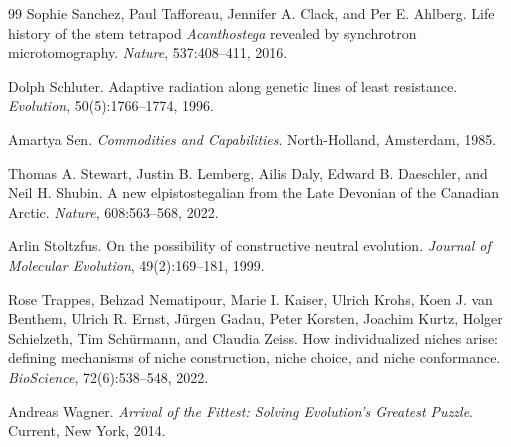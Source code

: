\documentclass[11pt,a4paper]{article}
\theoremstyle{remark}
\begin{document}
\begin{thebibliography}{99}
Sophie Sanchez, Paul Tafforeau, Jennifer A. Clack, and Per E. Ahlberg.
\newblock Life history of the stem tetrapod \emph{Acanthostega} revealed by synchrotron microtomography.
\newblock \emph{Nature}, 537:408--411, 2016.

Dolph Schluter.
\newblock Adaptive radiation along genetic lines of least resistance.
\newblock \emph{Evolution}, 50(5):1766--1774, 1996.

Amartya Sen.
\newblock \emph{Commodities and Capabilities}.
\newblock North-Holland, Amsterdam, 1985.

Thomas A. Stewart, Justin B. Lemberg, Ailis Daly, Edward B. Daeschler, and Neil H. Shubin.
\newblock A new elpistostegalian from the Late Devonian of the Canadian Arctic.
\newblock \emph{Nature}, 608:563--568, 2022.

Arlin Stoltzfus.
\newblock On the possibility of constructive neutral evolution.
\newblock \emph{Journal of Molecular Evolution}, 49(2):169--181, 1999.

Rose Trappes, Behzad Nematipour, Marie I. Kaiser, Ulrich Krohs, Koen J. van Benthem, Ulrich R. Ernst, J\"urgen Gadau, Peter Korsten, Joachim Kurtz, Holger Schielzeth, Tim Sch\"urmann, and Claudia Zeiss.
\newblock How individualized niches arise: defining mechanisms of niche construction, niche choice, and niche conformance.
\newblock \emph{BioScience}, 72(6):538--548, 2022.

Andreas Wagner.
\newblock \emph{Arrival of the Fittest: Solving Evolution's Greatest Puzzle}.
\newblock Current, New York, 2014.

\end{thebibliography}
\end{document}
